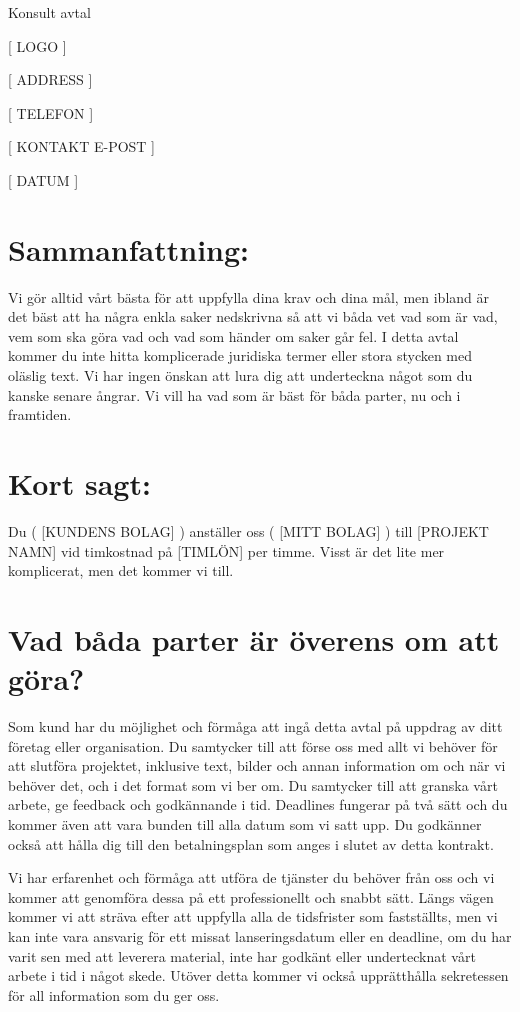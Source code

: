 \documentclass[10pt,a4paper,parskip]{scrartcl}
\begin{document}
\begin{center}
{\Large Konsult avtal}
\end{center}

[ LOGO ]

[ ADDRESS ]

[ TELEFON ]

[ KONTAKT E-POST ]

[ DATUM ]

\section{Sammanfattning:}

Vi gör alltid vårt bästa för att uppfylla dina krav och dina mål,
men ibland är det bäst att ha några enkla saker nedskrivna så att vi båda vet
vad som är vad, vem som ska göra vad och vad som händer om saker går fel. I
detta avtal kommer du inte hitta komplicerade juridiska termer eller stora
stycken med oläslig text. Vi har ingen önskan att lura dig att underteckna
något som du kanske senare ångrar. Vi vill ha vad som är bäst för båda parter,
nu och i framtiden.

\section{Kort sagt:}

Du ( [KUNDENS BOLAG] ) anställer oss ( [MITT BOLAG] ) till [PROJEKT NAMN] vid
timkostnad på [TIMLÖN] per timme. Visst är det lite mer komplicerat, men det
kommer vi till.

\section{Vad båda parter är överens om att göra?}

Som kund har du möjlighet och förmåga att ingå detta avtal på uppdrag av ditt
företag eller organisation. Du samtycker till att förse oss med allt vi
behöver för att slutföra projektet, inklusive text, bilder och annan
information om och när vi behöver det, och i det format som vi ber om. Du
samtycker till att granska vårt arbete, ge feedback och godkännande i tid.
Deadlines fungerar på två sätt och du kommer även att vara bunden till alla
datum som vi satt upp. Du godkänner också att hålla dig till den betalningsplan
som anges i slutet av detta kontrakt.

Vi har erfarenhet och förmåga att utföra de tjänster du behöver från oss och vi
kommer att genomföra dessa på ett professionellt och snabbt sätt. Längs vägen
kommer vi att sträva efter att uppfylla alla de tidsfrister som fastställts,
men vi kan inte vara ansvarig för ett missat lanseringsdatum eller en deadline,
om du har varit sen med att leverera material, inte har godkänt eller
undertecknat vårt arbete i tid i något skede. Utöver detta kommer vi också
upprätthålla sekretessen för all information som du ger oss.
\end{document}
